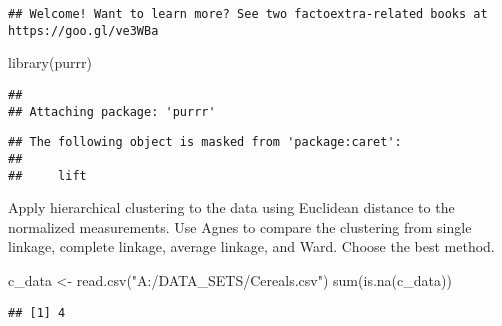 \documentclass[
]{article}
\newenvironment{Shaded}{\begin{snugshade}}{\end{snugshade}}
\newcommand{\FunctionTok}[1]{\textcolor[rgb]{0.00,0.00,0.00}{#1}}
\newcommand{\NormalTok}[1]{#1}
\newcommand{\OtherTok}[1]{\textcolor[rgb]{0.56,0.35,0.01}{#1}}
\newcommand{\StringTok}[1]{\textcolor[rgb]{0.31,0.60,0.02}{#1}}
\begin{document}
\begin{verbatim}
## Welcome! Want to learn more? See two factoextra-related books at https://goo.gl/ve3WBa
\end{verbatim}

\begin{Shaded}
\begin{Highlighting}[]
\FunctionTok{library}\NormalTok{(purrr)}
\end{Highlighting}
\end{Shaded}

\begin{verbatim}
## 
## Attaching package: 'purrr'
\end{verbatim}

\begin{verbatim}
## The following object is masked from 'package:caret':
## 
##     lift
\end{verbatim}

Apply hierarchical clustering to the data using Euclidean distance to
the normalized measurements. Use Agnes to compare the clustering from
single linkage, complete linkage, average linkage, and Ward. Choose the
best method.

\begin{Shaded}
\begin{Highlighting}[]
\NormalTok{c\_data }\OtherTok{\textless{}{-}} \FunctionTok{read.csv}\NormalTok{(}\StringTok{"A:/DATA\_SETS/Cereals.csv"}\NormalTok{)}
\FunctionTok{sum}\NormalTok{(}\FunctionTok{is.na}\NormalTok{(c\_data))}
\end{Highlighting}
\end{Shaded}

\begin{verbatim}
## [1] 4
\end{verbatim}
\end{document}
